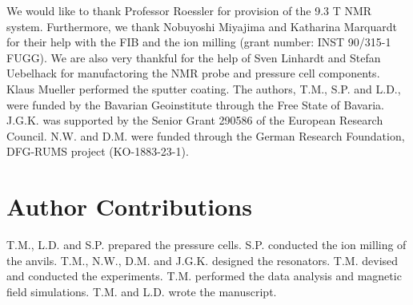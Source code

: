 \documentclass[aip,rsi,reprint,graphicx]{revtex4-1} %
\begin{document}
\begin{acknowledgments}
We would like to thank Professor Roessler for provision of the 9.3 T NMR system. Furthermore, we thank Nobuyoshi Miyajima and Katharina Marquardt for their help with the FIB and the ion
milling (grant number: INST 90/315-1 FUGG). We are also very thankful for the help of Sven Linhardt and Stefan Uebelhack for manufactoring the NMR probe and pressure cell components. Klaus Mueller performed the sputter coating.
 The authors, T.M., S.P. and L.D., were funded by the Bavarian Geoinstitute through the Free State of Bavaria. J.G.K. was supported by the Senior Grant 290586 of the European Research Council. N.W. and D.M. were funded through the German Research Foundation, DFG-RUMS project (KO-1883-23-1).
\end{acknowledgments}

\section{Author Contributions}

T.M., L.D. and S.P. prepared the pressure cells. S.P. conducted the ion milling of the anvils. T.M., N.W., D.M. and J.G.K. designed the resonators. T.M. devised and conducted the experiments. T.M. performed the data analysis and magnetic field simulations. T.M. and L.D. wrote the manuscript.

 
%
\end{document}
